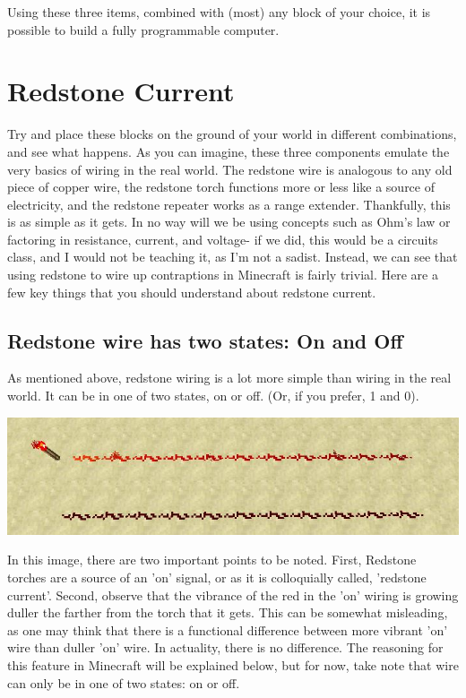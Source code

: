 \documentclass{article}
\begin{document}
\newpage

Using these three items, combined with (most) any block of your choice, it is possible to build a fully programmable computer.

\section{Redstone Current}

Try and place these blocks on the ground of your world in different combinations, and see what happens. As you can imagine, these three components emulate the very basics of wiring in the real world. The redstone wire is analogous to any old piece of copper wire, the redstone torch functions more or less like a source of electricity, and the redstone repeater works as a range extender.
\newline\newline
Thankfully, this is as simple as it gets. In no way will we be using concepts such as Ohm's law or factoring in resistance, current, and voltage- if we did, this would be a circuits class, and I would not be teaching it, as I'm not a sadist.
\newline\newline
Instead, we can see that using redstone to wire up contraptions in Minecraft is fairly trivial. Here are a few key things that you should understand about redstone current.

    \subsection{Redstone wire has two states: On and Off }
    As mentioned above, redstone wiring is a lot more simple than wiring in the real world. It can be in one of two states, on or off. (Or, if you prefer, 1 and 0).\newline
    
    \includegraphics[width=\textwidth]{misc1_2}\newline

    In this image, there are two important points to be noted. First, Redstone torches are a source of an 'on' signal, or as it is colloquially called, 'redstone current'. Second, observe that the vibrance of the red in the 'on' wiring is growing duller the farther from the torch that it gets. This can be somewhat misleading, as one may think that there is a functional difference between more vibrant 'on' wire than duller 'on' wire. In actuality, there is no difference. The reasoning for this feature in Minecraft will be explained below, but for now, take note that wire can only be in one of two states: on or off.
    
\end{document}

